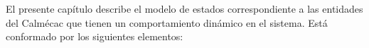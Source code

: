 El presente capítulo describe el modelo de estados correspondiente a las entidades del Calmécac que tienen un comportamiento dinámico en el sistema. Está conformado por los siguientes elementos:
%	
%
%
% 
%

